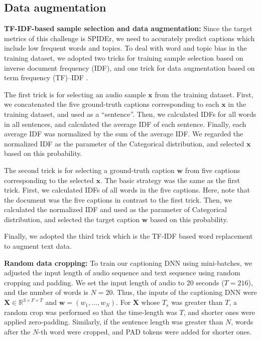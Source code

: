 \documentclass{article}
\begin{document}
\begin{sloppy}
\subsection{Data augmentation}

\vspace{3pt}
\noindent
{\bf TF-IDF-based sample selection and data augmentation:} Since the target metrics of this challenge is SPIDEr, we need to accurately predict captions which include low frequent words and topics.  
To deal with word and topic bias in the training dataset, we adopted two tricks for training sample selection based on inverse document frequency (IDF), and one trick for data augmentation based on term frequency (TF)--IDF \cite{uda}.


The first trick is for selecting an audio sample $\bm{x}$ from the training dataset.
First, we concatenated the five ground-truth captions corresponding to each $\bm{x}$ in the training dataset, and used as a ``sentence''.
Then, we calculated IDFs for all words in all sentences, and calculated the average IDF of each sentence.
Finally, each average IDF was normalized by the sum of the average IDF. We regarded the normalized IDF as the parameter of the Categorical distribution, and selected $\bm{x}$ based on this probability.

The second trick is for selecting a ground-truth caption $\bm{w}$ from five captions corresponding to the selected $\bm{x}$.
The basic strategy was the same as the first trick.
First, we calculated IDFs of all words in the five captions. Here, note that the document was the five captions in contrast to the first trick.
Then, we calculated the normalized IDF and used as the parameter of Categorical distribution, and selected the target caption $\bm{w}$ based on this probability.


Finally, we adopted the third trick which is the TF-IDF based word replacement \cite{uda} to augment text data.


\vspace{3pt}
\noindent
{\bf Random data cropping:} 
To train our captioning DNN using mini-batches, we adjusted the input length of audio sequence and text sequence using random cropping and padding.
We set the input length of audio to 20 seconds ($T=216$), and the number of words is $N=20$.
Thus, the inputs of the captioning DNN were $\bm{X} \in \mathbb{R}^{3 \times F \times T}$ and $\bm{w} = (w_1,...,w_N)$.
For $\bm{X}$ whose $T_s$ was greater than $T$, a random crop was performed so that the time-length was $T$, and shorter ones were applied zero-padding.
Similarly, if the sentence length was greater than $N$, words after the $N$-th word were cropped, and PAD tokens were added for shorter ones.



\end{sloppy}
\end{document}

